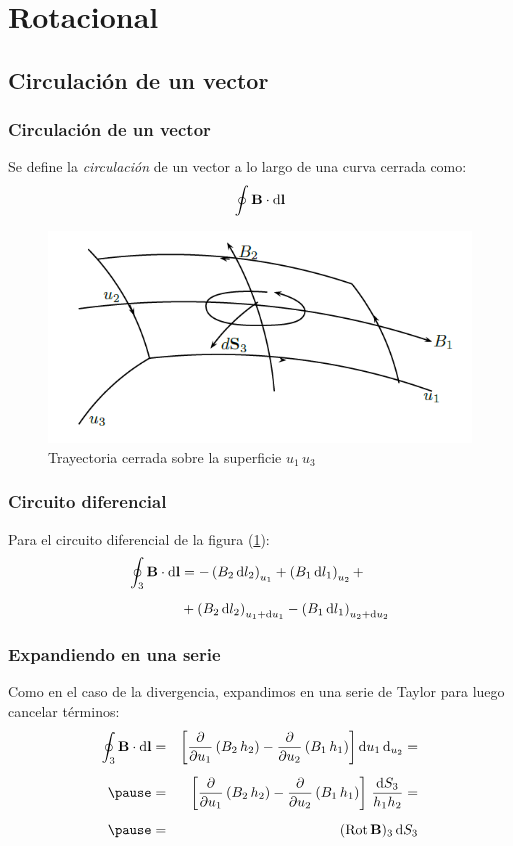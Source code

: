 \documentclass[12pt]{beamer}
\begin{document}
\section{Rotacional}
\subsection{Circulación de un vector}
\begin{frame}
\frametitle{Circulación de un vector}
Se define la \emph{circulación} de un vector a lo largo de una curva cerrada como:
\begin{align*}
\oint \vb{B} \cdot \dd{\vb{l}}
\end{align*}
\begin{figure}[h!]
    \centering
    \includegraphics[scale=0.4]{Imagenes/Circulacion_Vector.png}
    \caption{Trayectoria cerrada sobre la superficie $u_{1} \, u_{3}$}
    \label{fig:figura_trayectoria_cerrada}
\end{figure}
\end{frame}
\begin{frame}
\frametitle{Circuito diferencial}
Para el circuito diferencial de la figura (\ref{fig:figura_trayectoria_cerrada}):
\begin{align*}
\oint_{3} \vb{B} \cdot \dd{\vb{l}} &= - \left( B_{2} \dd{l_{2}} \right)_{u_{1}} + \left( B_{1} \dd{l_{1}} \right)_{u_{2}} + \\[0.5em]
&+ \left( B_{2} \dd{l_{2}} \right)_{u_{1}+\dd{u_{1}}} - \left( B_{1} \dd{l_{1}} \right)_{u_{2}+\dd{u_{2}}}
\end{align*}
\end{frame}
\begin{frame}
\frametitle{Expandiendo en una serie}
Como en el caso de la divergencia, expandimos en una serie de Taylor para luego cancelar términos:
\begin{eqnarray*}
\oint_{3} \vb{B} \cdot \dd{\vb{l}} &=& \left[ \displaystyle \pdv{u_{1}} \left( B_{2} \, h_{2}\right) - \pdv{u_{2}} \left( B_{1} \, h_{1} \right) \right] \dd{u_{1}} \dd_{u_{2}} = \\[0.5em] \pause
&=& \left[ \pdv{u_{1}} \left( B_{2} \, h_{2}\right) - \pdv{u_{2}} \left( B_{1} \, h_{1} \right) \right] \, \dfrac{\dd{S_{3}}}{h_{1} h_{2}} = \\[0.5em] \pause
&=& ({\rm{Rot}} \, \vb{B})_{3} \dd{S_{3}}
\end{eqnarray*}
\end{frame}
\end{document}
